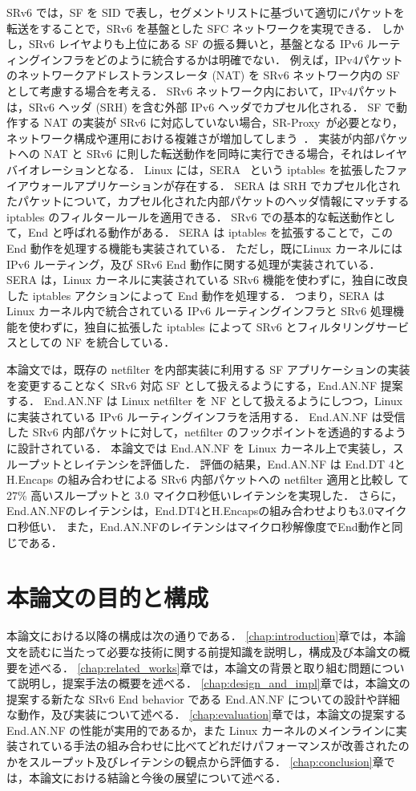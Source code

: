 SRv6 では，SF を SID で表し，セグメントリストに基づいて適切にパケットを転送をすることで，SRv6 を基盤とした SFC ネットワークを実現できる．
しかし，SRv6 レイヤよりも上位にある SF の振る舞いと，基盤となる IPv6 ルーティングインフラをどのように統合するかは明確でない．
例えば，IPv4パケットのネットワークアドレストランスレータ (NAT) を SRv6 ネットワーク内の SF として考慮する場合を考える．
SRv6 ネットワーク内において，IPv4パケットは，SRv6 ヘッダ (SRH) を含む外部 IPv6 ヘッダでカプセル化される．
SF で動作する NAT の実装が SRv6 に対応していない場合，SR-Proxy~\cite{ietf-spring-sr-service-programming-08}が必要となり，ネットワーク構成や運用における複雑さが増加してしまう~\cite{draft-scexp}．
実装が内部パケットへの NAT と SRv6 に則した転送動作を同時に実行できる場合，それはレイヤバイオレーションとなる． 
Linux には，SERA~\cite{sera} という iptables を拡張したファイアウォールアプリケーションが存在する．
SERA は SRH でカプセル化されたパケットについて，カプセル化された内部パケットのヘッダ情報にマッチする iptables のフィルタールールを適用できる．
SRv6 での基本的な転送動作として，End と呼ばれる動作がある．
SERA は iptables を拡張することで，この End 動作を処理する機能も実装されている．
ただし，既にLinux カーネルには IPv6 ルーティング，及び SRv6 End 動作に関する処理が実装されている．
SERA は，Linux カーネルに実装されている SRv6 機能を使わずに，独自に改良した iptables アクションによって End 動作を処理する．
つまり，SERA は Linux カーネル内で統合されている IPv6 ルーティングインフラと SRv6 処理機能を使わずに，独自に拡張した iptables によって SRv6 とフィルタリングサービスとしての NF を統合している．

本論文では，既存の netfilter を内部実装に利用する SF アプリケーションの実装を変更することなく SRv6 対応 SF として扱えるようにする，End.AN.NF 提案する．
End.AN.NF は Linux netfilter を NF として扱えるようにしつつ，Linux に実装されている IPv6 ルーティングインフラを活用する．
End.AN.NF は受信した SRv6 内部パケットに対して，netfilter のフックポイントを透過的するように設計されている．
本論文では End.AN.NF を Linux カーネル上で実装し，スループットとレイテンシを評価した．
評価の結果，End.AN.NF は End.DT 4と H.Encaps の組み合わせによる SRv6 内部パケットへの netfilter 適用と比較し て27\% 高いスループットと 3.0 マイクロ秒低いレイテンシを実現した．
さらに，End.AN.NFのレイテンシは，End.DT4とH.Encapsの組み合わせよりも3.0マイクロ秒低い．
また，End.AN.NFのレイテンシはマイクロ秒解像度でEnd動作と同じである．

\section{本論文の目的と構成}
本論文における以降の構成は次の通りである．
\ref*{chap:introduction}章では，本論文を読むに当たって必要な技術に関する前提知識を説明し，構成及び本論文の概要を述べる．
\ref*{chap:related_works}章では，本論文の背景と取り組む問題について説明し，提案手法の概要を述べる．
\ref*{chap:design_and_impl}章では，本論文の提案する新たな SRv6 End behavior である End.AN.NF についての設計や詳細な動作，及び実装について述べる．
\ref*{chap:evaluation}章では，本論文の提案する End.AN.NF の性能が実用的であるか，また Linux カーネルのメインラインに実装されている手法の組み合わせに比べてどれだけパフォーマンスが改善されたのかをスループット及びレイテンシの観点から評価する．
\ref*{chap:conclusion}章では，本論文における結論と今後の展望について述べる．